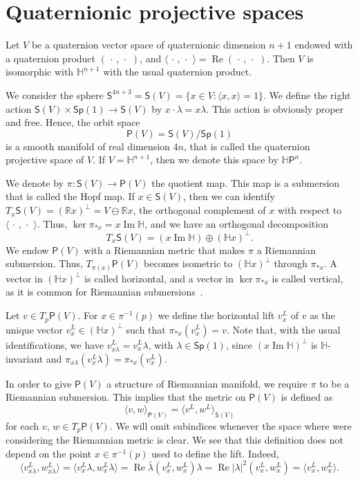 \documentclass[12pt, a4paper]{amsart}
\newcommand{\R}{\mathbb{R}}
\renewcommand{\H}{\mathbb{H}}
\renewcommand{\Re}{\operatorname{Re}}
\renewcommand{\Im}{\operatorname{Im}}
\newcommand{\Sp}{\mathsf{Sp}}
\theoremstyle{remark}
\begin{document}
\section{Quaternionic projective spaces}

Let $V$ be a quaternion vector space of quaternionic dimension $n+1$ endowed with a quaternion product $(\,\cdot\,,\,\cdot\,\,)$, and $\langle\,\cdot\,,\,\cdot\,\,\rangle=\Re(\,\cdot\,,\,\cdot\,\,)$.
Then $V$ is isomorphic with $\H^{n+1}$ with the usual quaternion product.

We consider the sphere $\mathsf{S}^{4n+3}=\mathsf{S}(V)=\{{x}\in V:\langle {x},{x}\rangle=1\}$.
We define the right action $\mathsf{S}(V)\times\Sp(1)\to\mathsf{S}(V)$ by ${x}\cdot \lambda={x}\lambda$.
This action is obviously proper and free. 
Hence, the orbit space 
\[
\mathsf{P}(V)=\mathsf{S}(V)/\Sp(1)
\]
is a smooth manifold of real dimension $4n$, that is called the quaternion projective space of $V$.
If $V=\H^{n+1}$, then we denote this space by $\H \mathsf{P}^n$.

We denote by $\pi\colon\mathsf{S}(V)\to\mathsf{P}(V)$ the quotient map.
This map is a submersion that is called the Hopf map.
If ${x}\in\mathsf{S}(V)$, then we can identify $T_{x}\mathsf{S}(V)=(\R{x})^\perp=V\ominus\R{x}$, the orthogonal complement of ${x}$ with respect to $\langle\,\cdot\,,\,\cdot\,\,\rangle$.
Thus, $\ker\pi_{*{x}}={x}\Im\H$, and we have an orthogonal decomposition 
\[
T_{x}\mathsf{S}(V)=({x}\Im\H)\oplus(\H{x})^\perp.
\]
We endow $\mathsf{P}(V)$ with a Riemannian metric that makes $\pi$ a Riemannian submersion.
Thus, $T_{\pi({x})}\mathsf{P}(V)$ becomes isometric to $(\H{x})^\perp$ through $\pi_{*{x}}$.
A vector in $(\H x)^\perp$ is called horizontal, and a vector in $\ker\pi_{*x}$ is called vertical, as it is common for Riemannian submersions~\cite{ONeill}.

Let $v\in T_{p}\mathsf{P}(V)$.
For ${x}\in\pi^{-1}(p)$ we define the horizontal lift $v^L_{x}$ of $v$ as the unique vector $v_x^L\in(\H{x})^\perp$ such that $\pi_{*{x}}(v^L_{x})=v$.
Note that, with the usual identifications, we have $v_{x\lambda}^L=v_x^L\lambda$, with $\lambda\in\Sp(1)$, since $(x\Im\H)^\perp$ is $\H$-invariant and $\pi_{x\lambda}(v_x^L\lambda)=\pi_{*x}(v_x^L)$.
\medskip

In order to give $\mathsf{P}(V)$ a structure of Riemannian manifold, we require $\pi$ to be a Riemannian submersion.
This implies that the metric on $\mathsf{P}(V)$ is defined as 
\[
\langle v,w\rangle_{\mathsf{P}(V)}=\langle v^L,w^L\rangle_{\mathsf{S}(V)}
\] 
for each $v$, $w\in T_p\mathsf{P}(V)$.
We will omit subindices whenever the space where were considering the Riemannian metric is clear.
We see that this definition does not depend on the point ${x}\in\pi^{-1}(p)$ used to define the lift.
Indeed,
\[
\langle v^L_{{x}\lambda},w^L_{{x}\lambda}\rangle=
\langle v^L_{{x}}\lambda,w^L_{{x}}\lambda\rangle=
\Re\bar{\lambda}(v^L_{x},w^L_{x})\lambda=
\Re\lvert\lambda\rvert^2(v^L_{x},w^L_{x})=
\langle v^L_{x},w^L_{x}\rangle.
\]
\end{document}
